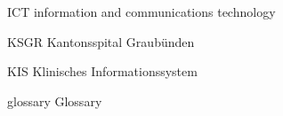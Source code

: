 
\begin{abkuerzungen}[MUSTER] %
    \item[ICT] information and communications technology
    \item[KSGR] Kantonsspital Graubünden
    \item[KIS] Klinisches Informationssystem
    \item[\gls{glossary}] Glossary
\end{abkuerzungen}